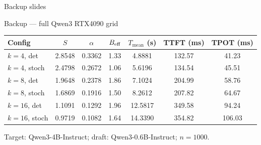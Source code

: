 \documentclass[aspectratio=169, 11pt]{beamer}
\begin{document}
\appendix

\begin{frame}[standout]
  Backup slides
\end{frame}

\begin{frame}{Backup --- full Qwen3 RTX4090 grid}
  \centering
  \small
  \begin{tabular}{lcccccc}
    \toprule
    \textbf{Config} & $S$ & $\alpha$ & $B_{\text{eff}}$ & $T_{\text{mean}}$ (s)
    & TTFT (ms) & TPOT (ms)\\
    \midrule
    $k{=}4$, det   & 2.8548 & 0.3362 & 1.33 & 4.8881 & 132.57 & 41.23\\
    $k{=}4$, stoch & 2.4798 & 0.2672 & 1.06 & 5.6196 & 134.54 & 45.51\\
    $k{=}8$, det   & 1.9648 & 0.2378 & 1.86 & 7.1024 & 204.99 & 58.76\\
    $k{=}8$, stoch & 1.6869 & 0.1916 & 1.50 & 8.2612 & 207.82 & 64.67\\
    $k{=}16$, det  & 1.1091 & 0.1292 & 1.96 & 12.5817 & 349.58 & 94.24\\
    $k{=}16$, stoch& 0.9719 & 0.1082 & 1.64 & 14.3390 & 354.82 & 106.03\\
    \bottomrule
  \end{tabular}
  \vspace{6pt}

  \small Target: Qwen3-4B-Instruct; draft: Qwen3-0.6B-Instruct; $n{=}1000$.
\end{frame}
\end{document}
